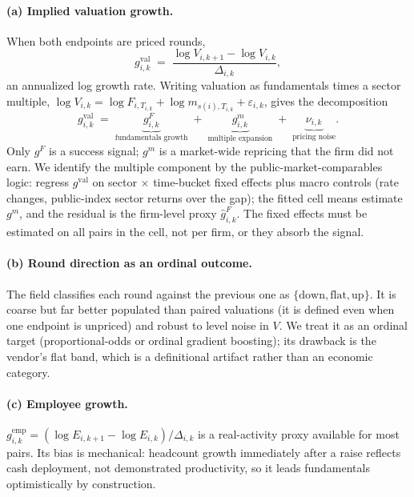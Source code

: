 \paragraph{(a) Implied valuation growth.} When both endpoints are priced rounds,
\begin{equation}\label{eq:us-gval}
g^{\mathrm{val}}_{i,k} \;=\; \frac{\log V_{i,k+1} - \log
V_{i,k}}{\Delta_{i,k}},
\end{equation}
an annualized log growth rate. Writing valuation as fundamentals times a sector multiple, $\log
V_{i,k} = \log F_{i,T_{i,k}} + \log m_{s(i),T_{i,k}} + \varepsilon_{i,k}$, gives the
decomposition
\begin{equation}\label{eq:us-decomp}
g^{\mathrm{val}}_{i,k}
\;=\; \underbrace{g^{F}_{i,k}}_{\text{fundamentals growth}}
\;+\; \underbrace{g^{m}_{i,k}}_{\text{multiple expansion}}
\;+\; \underbrace{\nu_{i,k}}_{\text{pricing noise}} .
\end{equation}
Only $g^{F}$ is a success signal; $g^{m}$ is a market-wide repricing that the firm did not earn.
We identify the multiple component by the public-market-comparables logic: regress
$g^{\mathrm{val}}$ on sector $\times$ time-bucket fixed effects plus macro controls (rate
changes, public-index sector returns over the gap); the fitted cell means estimate $g^{m}$, and
the residual is the firm-level proxy $\hat{g}^{F}_{i,k}$. The fixed effects must be estimated on
all pairs in the cell, not per firm, or they absorb the signal.

\paragraph{(b) Round direction as an ordinal outcome.} The field
 classifies each round against the previous one as
$\{\text{down}, \text{flat}, \text{up}\}$. It is coarse but far better populated than paired
valuations (it is defined even when one endpoint is unpriced) and robust to level noise in $V$.
We treat it as an ordinal target (proportional-odds or ordinal gradient boosting); its drawback
is the vendor's flat band, which is a definitional artifact rather than an economic category.

\paragraph{(c) Employee growth.} $g^{\mathrm{emp}}_{i,k} = (\log E_{i,k+1} - \log
E_{i,k})/\Delta_{i,k}$ is a real-activity proxy available for most pairs. Its bias is
mechanical: headcount growth immediately after a raise reflects cash deployment, not
demonstrated productivity, so it leads fundamentals optimistically by construction.

